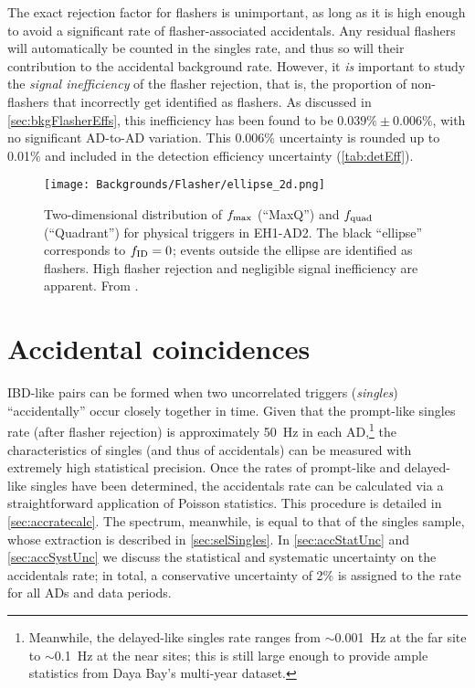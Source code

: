 \documentclass[../thesis.tex]{subfiles}
\begin{document}

The exact rejection factor for flashers is unimportant, as long as it is high enough to avoid a significant rate of flasher-associated accidentals. Any residual flashers will automatically be counted in the singles rate, and thus so will their contribution to the accidental background rate. However, it \emph{is} important to study the \emph{signal inefficiency} of the flasher rejection, that is, the proportion of non-flashers that incorrectly get identified as flashers. As discussed in \autoref{sec:bkgFlasherEffs}, this inefficiency has been found to be $0.039\% \pm 0.006\%$, with no significant AD-to-AD variation. This 0.006\% uncertainty is rounded up to 0.01\% and included in the detection efficiency uncertainty (\autoref{tab:detEff}).

\begin{figure}[ht!]
  \texttt{[image: Backgrounds/Flasher/ellipse\_2d.png]}
  \caption{Two-dimensional distribution of $f_{\mathrm{max}}$ (``MaxQ'') and $f_{\mathrm{quad}}$ (``Quadrant'') for physical triggers in EH1-AD2. The black ``ellipse'' corresponds to $f_{\mathrm{ID}} = 0$; events outside the ellipse are identified as flashers. High flasher rejection and negligible signal inefficiency are apparent. From \cite{flasherControl}.}
  \label{fig:bkgFlasherEllipse2DOverview}
\end{figure}

\section{Accidental coincidences}
\label{sec:accbkg}

IBD-like pairs can be formed when two uncorrelated triggers (\emph{singles}) ``accidentally'' occur closely together in time. Given that the prompt-like singles rate (after flasher rejection) is approximately 50~Hz in each AD,\footnote{Meanwhile, the delayed-like singles rate ranges from $\sim$0.001~Hz at the far site to $\sim$0.1~Hz at the near sites; this is still large enough to provide ample statistics from Daya Bay's multi-year dataset.} the characteristics of singles (and thus of accidentals) can be measured with extremely high statistical precision. Once the rates of prompt-like and delayed-like singles have been determined, the accidentals rate can be calculated via a straightforward application of Poisson statistics. This procedure is detailed in \autoref{sec:accratecalc}. The spectrum, meanwhile, is equal to that of the singles sample, whose extraction is described in \autoref{sec:selSingles}. In \autoref{sec:accStatUnc} and \autoref{sec:accSystUnc} we discuss the statistical and systematic uncertainty on the accidentals rate; in total, a conservative uncertainty of 2\% is assigned to the rate for all ADs and data periods.
\end{document}
